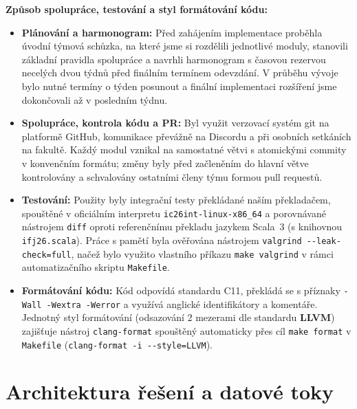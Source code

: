 \documentclass[11pt, a4paper]{article}
\begin{document}
\textbf{Způsob spolupráce, testování a styl formátování kódu:}
\begin{itemize}
  \item \textbf{Plánování a harmonogram:} Před zahájením implementace proběhla úvodní týmová schůzka, na které jsme si rozdělili jednotlivé moduly, stanovili základní pravidla spolupráce a navrhli harmonogram s časovou rezervou necelých dvou týdnů před finálním termínem odevzdání. V průběhu vývoje bylo nutné termíny o týden posunout a finální implementaci rozšíření jsme dokončovali až v posledním týdnu.
  \item \textbf{Spolupráce, kontrola kódu a PR:} Byl využit verzovací systém git na platformě GitHub, komunikace převážně na Discordu a při osobních setkáních na fakultě. Každý modul vznikal na samostatné větvi s atomickými commity v konvenčním formátu; změny byly před začleněním do hlavní větve kontrolovány a schvalovány ostatními členy týmu formou pull requestů. 
  \item \textbf{Testování:} Použity byly integrační testy překládané naším překladačem, spouštěné v oficiálním interpretu \texttt{ic26int-linux-x86\_64} a porovnávané nástrojem \texttt{diff} oproti referenčnímu překladu jazykem Scala~3 (s knihovnou \texttt{ifj26.scala}). Práce s pamětí byla ověřována nástrojem \texttt{valgrind -{}-leak-check=full}, načež bylo využito vlastního příkazu \texttt{make valgrind} v rámci automatizačního skriptu \texttt{Makefile}.
  \item \textbf{Formátování kódu:} Kód odpovídá standardu C11, překládá se s příznaky \texttt{-Wall -Wextra -Werror} a využívá anglické identifikátory a komentáře. Jednotný styl formátování (odsazování 2 mezerami dle standardu \textbf{LLVM}) zajišťuje nástroj \texttt{clang-format} spouštěný automaticky přes cíl \texttt{make format} v \texttt{Makefile} (\texttt{clang-format -i -{}-style=LLVM}).
\end{itemize}

\newpage
\section{Architektura řešení a datové toky}
\end{document}
